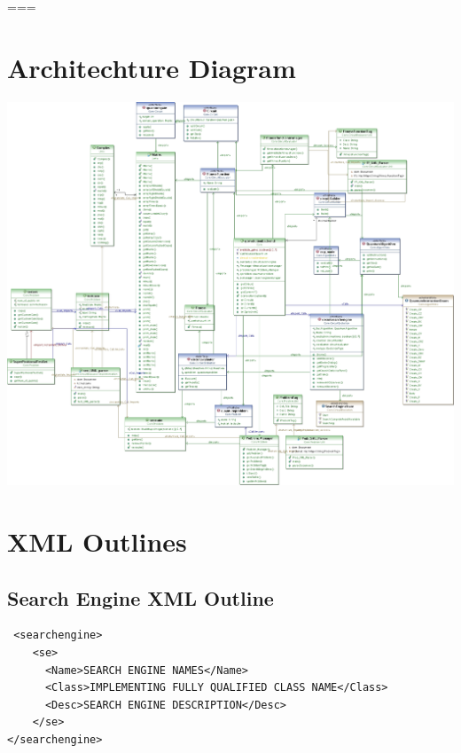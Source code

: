 \cleardoublepage
\begingroup
\advance\textwidth\pdfpagewidth
\hsize=\textwidth\linewidth=\hsize\columnwidth=\hsize
{}\pdfpagewidth

\chapter{Architechture Diagram}
\label{sec:archdesign}
\centering
\includegraphics[height=0.85\textheight]{highlevelarchitecture.jpg}
\cleardoublepage
\endgroup

\chapter{XML Outlines}
\section{Search Engine XML Outline}
\label{sec:semanspecxml}
\lstset{language = XML}
\begin{lstlisting}
 <searchengine>
	<se>
	  <Name>SEARCH ENGINE NAMES</Name>
	  <Class>IMPLEMENTING FULLY QUALIFIED CLASS NAME</Class>
	  <Desc>SEARCH ENGINE DESCRIPTION</Desc>
	</se>
</searchengine>
\end{lstlisting}

